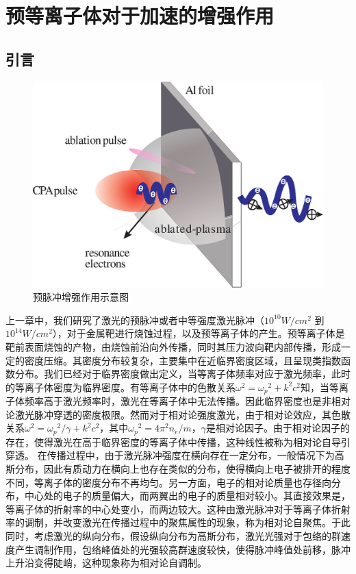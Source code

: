 
\chapter{预等离子体对于加速的增强作用}
\label{chap:preplasmaEhancement}




\section{引言}
\begin{figure}[!htbp]
  \centering
  \includegraphics[width=\MyFactor\textwidth]{Img/enhancement.eps}
  \caption{预脉冲增强作用示意图}
  \label{fig:prepulse2012}
\end{figure}

上一章中，我们研究了激光的预脉冲或者中等强度激光脉冲（$10^{10}W/cm^2$ 到 $10^{14}W/cm^2$），对于金属靶进行烧蚀过程，以及预等离子体的产生。预等离子体是靶前表面烧蚀的产物，由烧蚀前沿向外传播，同时其压力波向靶内部传播，形成一定的密度压缩。其密度分布较复杂，主要集中在近临界密度区域，且呈现类指数函数分布。我们已经对于临界密度做出定义，当等离子体频率对应于激光频率，此时的等离子体密度为临界密度。有等离子体中的色散关系${\omega}^2={{\omega}_p}^2 +k^2 c^2$知，当等离子体频率高于激光频率时，激光在等离子体中无法传播。因此临界密度也是非相对论激光脉冲穿透的密度极限。然而对于相对论强度激光，由于相对论效应，其色散关系${\omega}^2={{\omega}_p}^2/{\gamma} +k^2 c^2$，其中${{\omega}_p}^2=4 {\pi}^2 n_e/m $，$\gamma$是相对论因子。由于相对论因子的存在，使得激光在高于临界密度的等离子体中传播，这种线性被称为相对论自导引穿透。
在传播过程中，由于激光脉冲强度在横向存在一定分布，一般情况下为高斯分布，因此有质动力在横向上也存在类似的分布，使得横向上电子被排开的程度不同，等离子体的密度分布不再均匀。另一方面，电子的相对论质量也存径向分布，中心处的电子的质量偏大，而两翼出的电子的质量相对较小。其直接效果是，等离子体的折射率的中心处变小，而两边较大。这种由激光脉冲对于等离子体折射率的调制，并改变激光在传播过程中的聚焦属性的现象，称为相对论自聚焦。于此同时，考虑激光的纵向分布，假设纵向分布为高斯分布，激光光强对于包络的群速度产生调制作用，包络峰值处的光强较高群速度较快，使得脉冲峰值处前移，脉冲上升沿变得陡峭，这种现象称为相对论自调制。


